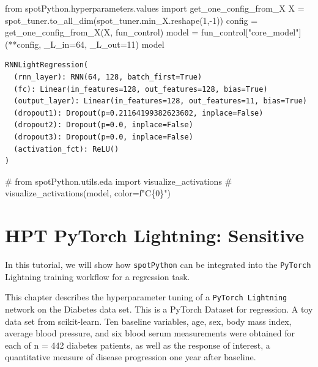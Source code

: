 \documentclass[
  letterpaper,
  DIV=11,
  numbers=noendperiod]{scrreprt}
\newenvironment{Shaded}{\begin{snugshade}}{\end{snugshade}}
\newcommand{\CommentTok}[1]{\textcolor[rgb]{0.37,0.37,0.37}{#1}}
\newcommand{\DecValTok}[1]{\textcolor[rgb]{0.68,0.00,0.00}{#1}}
\newcommand{\ImportTok}[1]{\textcolor[rgb]{0.00,0.46,0.62}{#1}}
\newcommand{\NormalTok}[1]{\textcolor[rgb]{0.00,0.23,0.31}{#1}}
\newcommand{\OperatorTok}[1]{\textcolor[rgb]{0.37,0.37,0.37}{#1}}
\newcommand{\StringTok}[1]{\textcolor[rgb]{0.13,0.47,0.30}{#1}}
\begin{document}
\begin{Shaded}
\begin{Highlighting}[]
\ImportTok{from}\NormalTok{ spotPython.hyperparameters.values }\ImportTok{import}\NormalTok{ get\_one\_config\_from\_X}
\NormalTok{X }\OperatorTok{=}\NormalTok{ spot\_tuner.to\_all\_dim(spot\_tuner.min\_X.reshape(}\DecValTok{1}\NormalTok{,}\OperatorTok{{-}}\DecValTok{1}\NormalTok{))}
\NormalTok{config }\OperatorTok{=}\NormalTok{ get\_one\_config\_from\_X(X, fun\_control)}
\NormalTok{model }\OperatorTok{=}\NormalTok{ fun\_control[}\StringTok{"core\_model"}\NormalTok{](}\OperatorTok{**}\NormalTok{config, \_L\_in}\OperatorTok{=}\DecValTok{64}\NormalTok{, \_L\_out}\OperatorTok{=}\DecValTok{11}\NormalTok{)}
\NormalTok{model}
\end{Highlighting}
\end{Shaded}

\begin{verbatim}
RNNLightRegression(
  (rnn_layer): RNN(64, 128, batch_first=True)
  (fc): Linear(in_features=128, out_features=128, bias=True)
  (output_layer): Linear(in_features=128, out_features=11, bias=True)
  (dropout1): Dropout(p=0.21164199382623602, inplace=False)
  (dropout2): Dropout(p=0.0, inplace=False)
  (dropout3): Dropout(p=0.0, inplace=False)
  (activation_fct): ReLU()
)
\end{verbatim}

\begin{Shaded}
\begin{Highlighting}[]
\CommentTok{\# from spotPython.utils.eda import visualize\_activations}
\CommentTok{\# visualize\_activations(model, color=f"C\{0\}")}
\end{Highlighting}
\end{Shaded}

\chapter{HPT PyTorch Lightning:
Sensitive}\label{hpt-pytorch-lightning-sensitive}

In this tutorial, we will show how \texttt{spotPython} can be integrated
into the \texttt{PyTorch} Lightning training workflow for a regression
task.

This chapter describes the hyperparameter tuning of a
\texttt{PyTorch\ Lightning} network on the Diabetes data set. This is a
PyTorch Dataset for regression. A toy data set from scikit-learn. Ten
baseline variables, age, sex, body mass index, average blood pressure,
and six blood serum measurements were obtained for each of n = 442
diabetes patients, as well as the response of interest, a quantitative
measure of disease progression one year after baseline.
\end{document}
